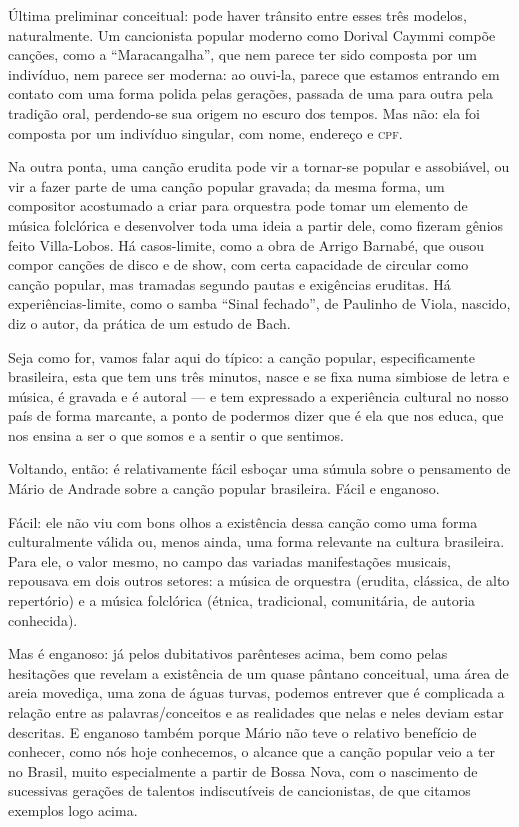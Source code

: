 Última preliminar conceitual: pode haver trânsito entre esses três
modelos, naturalmente. Um cancionista popular moderno como Dorival
Caymmi compõe canções, como a ``Maracangalha'', que nem parece ter sido
composta por um indivíduo, nem parece ser moderna: ao ouvi-la, parece
que estamos entrando em contato com uma forma polida pelas gerações,
passada de uma para outra pela tradição oral, perdendo-se sua origem no
escuro dos tempos. Mas não: ela foi composta por um indivíduo singular,
com nome, endereço e \textsc{cpf}.

Na outra ponta, uma canção erudita pode vir a tornar-se popular e
assobiável, ou vir a fazer parte de uma canção popular gravada; da mesma
forma, um compositor acostumado a criar para orquestra pode tomar um
elemento de música folclórica e desenvolver toda uma ideia a partir
dele, como fizeram gênios feito Villa-Lobos. Há casos-limite, como a
obra de Arrigo Barnabé, que ousou compor canções de disco e de show, com
certa capacidade de circular como canção popular, mas tramadas segundo
pautas e exigências eruditas. Há experiências-limite, como o samba
``Sinal fechado'', de Paulinho de Viola, nascido, diz o autor, da
prática de um estudo de Bach.

Seja como for, vamos falar aqui do típico: a canção popular,
especificamente brasileira, esta que tem uns três minutos, nasce e se
fixa numa simbiose de letra e música, é gravada e é autoral --- e tem
expressado a experiência cultural no nosso país de forma marcante, a
ponto de podermos dizer que é ela que nos educa, que nos ensina a ser o
que somos e a sentir o que sentimos.

Voltando, então: é relativamente fácil esboçar uma súmula sobre o
pensamento de Mário de Andrade sobre a canção popular brasileira. Fácil
e enganoso.

Fácil: ele não viu com bons olhos a existência dessa canção como uma
forma culturalmente válida ou, menos ainda, uma forma relevante na
cultura brasileira. Para ele, o valor mesmo, no campo das variadas
manifestações musicais, repousava em dois outros setores: a música de
orquestra (erudita, clássica, de alto repertório) e a música folclórica
(étnica, tradicional, comunitária, de autoria conhecida).

Mas é enganoso: já pelos dubitativos parênteses acima, bem como pelas
hesitações que revelam a existência de um quase pântano conceitual, uma
área de areia movediça, uma zona de águas turvas, podemos entrever que é
complicada a relação entre as palavras/conceitos e as realidades que
nelas e neles deviam estar descritas. E enganoso também porque Mário não
teve o relativo benefício de conhecer, como nós hoje conhecemos, o
alcance que a canção popular veio a ter no Brasil, muito especialmente a
partir de Bossa Nova, com o nascimento de sucessivas gerações de
talentos indiscutíveis de cancionistas, de que citamos exemplos logo
acima.

